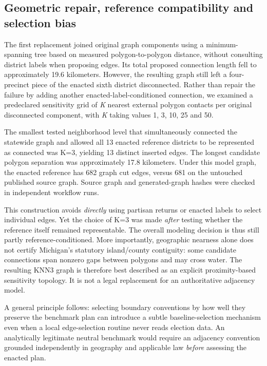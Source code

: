 \documentclass[
  10pt,
]{article}
\begin{document}
\hypertarget{geometric-repair-reference-compatibility-and-selection-bias}{%
\subsection{Geometric repair, reference compatibility and selection
bias}\label{geometric-repair-reference-compatibility-and-selection-bias}}

The first replacement joined original graph components using a
minimum-spanning tree based on measured polygon-to-polygon distance,
without consulting district labels when proposing edges. Its total
proposed connection length fell to approximately 19.6 kilometers.
However, the resulting graph still left a four-precinct piece of the
enacted sixth district disconnected. Rather than repair the failure by
adding another enacted-label-conditioned connection, we examined a
predeclared sensitivity grid of \emph{K} nearest external polygon
contacts per original disconnected component, with \emph{K} taking
values 1, 3, 10, 25 and 50.

The smallest tested neighborhood level that simultaneously connected the
statewide graph and allowed all 13 enacted reference districts to be
represented as connected was K=3, yielding 13 distinct inserted edges.
The longest candidate polygon separation was approximately 17.8
kilometers. Under this model graph, the enacted reference has 682 graph
cut edges, versus 681 on the untouched published source graph. Source
graph and generated-graph hashes were checked in independent workflow
runs.

This construction avoids \emph{directly} using partisan returns or
enacted labels to select individual edges. Yet the choice of K=3 was
made \emph{after} testing whether the reference itself remained
representable. The overall modeling decision is thus still partly
reference-conditioned. More importantly, geographic nearness alone does
not certify Michigan's statutory island/county contiguity: some
candidate connections span nonzero gaps between polygons and may cross
water. The resulting KNN3 graph is therefore best described as an
explicit proximity-based sensitivity topology. It is not a legal
replacement for an authoritative adjacency model.

A general principle follows: selecting boundary conventions by how well
they preserve the benchmark plan can introduce a subtle
baseline-selection mechanism even when a local edge-selection routine
never reads election data. An analytically legitimate neutral benchmark
would require an adjacency convention grounded independently in
geography and applicable law \emph{before} assessing the enacted plan.
\end{document}

